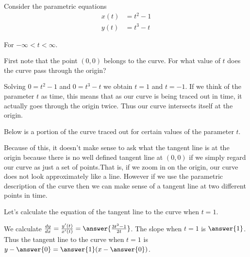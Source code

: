 \documentclass{ximera}
\author{Jason Miller}
\begin{document}
\begin{exercise}
Consider the parametric equations 
\begin{align*}
x(t) &= t^2-1\\
y(t) &= t^3-t
\end{align*}

For $-\infty < t < \infty$.

First note that the point $(0,0)$ belongs to the curve. For what value of $t$ does the curve pass through the origin?

Solving $0=t^2-1$ and $0=t^3-t$ we obtain $t=1$ and $t=-1$. If we think of the parameter $t$ as time, this means that as our 
curve is being traced out in time, it actually goes through the origin twice. Thus our curve intersects itself at the origin. 

Below is a portion of the curve traced out for certain values of the parameter $t$.

\begin{image}  
\end{image} 



Because of this, it doesn't make sense to ask what the tangent line is at the origin because there is no well defined tangent line at $(0,0)$ if we simply regard our curve as just a set of points.That is, if we zoom in on the origin, our curve does not look approximately like a line. However if we use the parametric description of the curve then we can make sense of a tangent line at two different points in time. 

Let's calculate the equation of the tangent line to the curve when $t=1$. 

We calculate $\frac{dy}{dx}=\frac{y'(t)}{x'(t)}=\answer{ \frac{3t^2-1}{2t}}$. The slope when $t=1$ is $\answer{1}$. Thus the tangent line to the curve when $t=1$ is
$y-\answer{0}=\answer{1}(x-\answer{0})$. 


\end{exercise}
\end{document}
